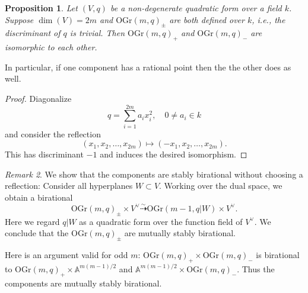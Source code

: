 \documentclass[12pt]{amsart}
\numberwithin{equation}{section}
\newcommand{\bA}{\mathbb{A}}
\newcommand{\OGr}{\mathrm{OGr}}
\theoremstyle{plain}
\newtheorem{prop}{Proposition}[section]
\theoremstyle{definition}
\theoremstyle{remark}
\newtheorem{rema}[prop]{Remark}
\begin{document}







\begin{prop}
\label{prop:vq}
Let $(V,q)$ be a non-degenerate quadratic form
over a field $k$. 
Suppose $\dim(V)=2m$ and $\OGr(m,q)_{\pm}$ are both
defined over $k$, i.e., the discriminant of $q$
is trivial. Then $\OGr(m,q)_+$ and $\OGr(m,q)_-$
are isomorphic to each other. 
\end{prop}
In particular, if one component has a rational point then the
the other does as well.
\begin{proof}
Diagonalize 
$$q=\sum_{i=1}^{2m} a_i x_i^2, \quad 0 \neq a_i \in k$$
and consider the reflection
$$(x_1,x_2,\ldots,x_{2m}) \mapsto (-x_1,x_2,\ldots,x_{2m}).$$
This has discriminant $-1$ and induces the desired isomorphism.
\end{proof}
\begin{rema} \label{rema:weakvq}
We show that the components are stably birational without choosing
a reflection: Consider all hyperplanes $W \subset V$. 
Working over the dual space, we obtain a birational
$$
\OGr(m,q)_{\pm} \times V^{\vee} 
\stackrel{\sim}{\dashrightarrow} 
\OGr(m-1,q|W) \times V^{\vee}.$$
Here we regard $q|W$ as a quadratic form over 
the function field of $V^{\vee}$.  
We conclude that the $\OGr(m,q)_{\pm}$ are
mutually stably birational.

Here is an argument valid for odd $m$:
$\OGr(m,q)_+ \times \OGr(m,q)_-$ is birational
to $\OGr(m,q)_+ \times \bA^{m(m-1)/2}$ and
$\bA^{m(m-1)/2} \times \OGr(m,q)_-$.
Thus the components are mutually stably birational.
\end{rema}
\end{document}
